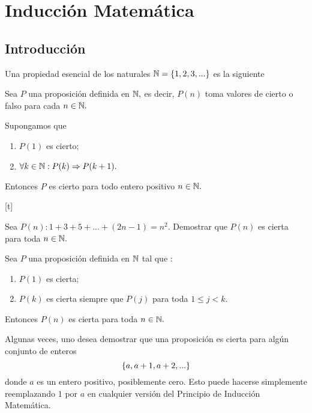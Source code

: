 \section{Inducción Matemática}

\subsection{Introducción}


	Una propiedad esencial de los naturales $\mathbb{N}=\left\{ 1,2,3,... \right\}$  es la siguiente
	
	
	\begin{ax}
		Sea $P$ una proposición definida en $\mathbb{N},$ es decir, $P(n)$ toma valores de cierto o falso para cada $n\in \mathbb{N}.$
		
		Supongamos que
		\begin{enumerate}
			\item $P(1)$ es cierto;
			\item $\forall k \in \mathbb{N}: P(k) \Rightarrow P(k+1).$
		\end{enumerate}
		
		Entonces $P$ es {cierto} para todo entero positivo $n\in \mathbb{N}.$
	\end{ax}
	


[t]
	\begin{problema}
		Sea $P(n):1+3+5+...+(2n-1)=n^2.$ Demostrar que $P(n)$ es cierta para toda $n \in \mathbb{N}.$ 
	\end{problema}



	\begin{ax}
		Sea $P$ una proposición definida en $\mathbb{N}$ tal que :
		\begin{enumerate}
			\item $P(1)$ es cierta;
			\item $P(k)$ es cierta siempre que $P(j)$ para toda $1\leq j < k.$
		\end{enumerate}
		Entonces $P(n)$ es cierta para toda $n\in \mathbb{N}.$
	\end{ax}
	



	\begin{rem}
		Algunas veces, uno desea demostrar que una proposición es cierta para algún conjunto de enteros
		$$
		\left\{ a,a+1, a+2,... \right\}
		$$
		donde $a$ es un entero positivo, posiblemente cero. Esto puede hacerse simplemente reemplazando $1$ por $a$ en cualquier versión del Principio de Inducción Matemática. 
	\end{rem}
	
